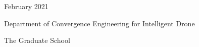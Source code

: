 \documentclass[
11pt, %
english, %
doublespacing, %
liststotoc, %
headsepline, %
]{MastersDoctoralThesis} %
\author{Tran Hoang Anh} %
\begin{document}
	
	\frontmatter %
	
	\pagestyle{plain} %
	

\begin{titlepage}
	\begin{center}
		
		\vspace*{.01\textheight}
		
		{\bfseries \fontsize{21}{20}\selectfont \ttitle\par}\vspace{3cm} 
		
		{\fontsize{16}{12}\selectfont \authorname\par}\vspace{2.5cm} 
		
		{\fontsize{14}{12}\selectfont February 2021\par}\vspace{2.5cm} 
		
		{\fontsize{16}{12}\selectfont  \deptname\par}\vspace{0.4cm}
		{\fontsize{16}{12}\selectfont  Department of Convergence Engineering for Intelligent Drone\par}\vspace{0.4cm}
		{\fontsize{16}{12}\selectfont  The Graduate School\par}\vspace{0.4cm} 
		{\fontsize{16}{12}\selectfont  \univname \par}
		
		\vfill
	\end{center}
\end{titlepage}


\end{document}
